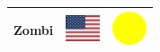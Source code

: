 \documentclass[12pt, a4paper, twoside]{report}
\begin{document}
\begin{center}
\begin{longtable}{|p{5cm}|p{2cm}|p{2cm}|}
 Zombi                                                      & \includegraphics[width=1cm]{../img/flags/us} &   \includegraphics[width=1cm]{../likes/m} \\ \hline
		\end{longtable}
	\end{center}
\end{document}
